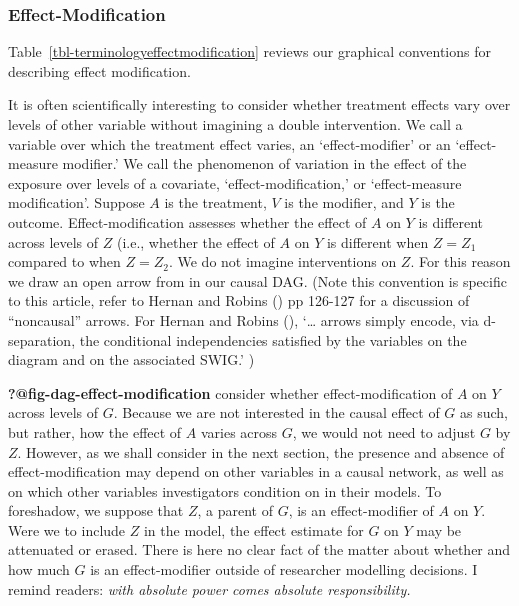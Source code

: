 \documentclass[
  single column]{article}
\begin{document}
\subsubsection{Effect-Modification}\label{effect-modification}

Table~\ref{tbl-terminologyeffectmodification} reviews our graphical
conventions for describing effect modification.

\begin{table}

\caption{\label{tbl-terminologyeffectmodification}}

\centering{

\captionsetup{labelsep=none}

\terminologyeffectmodification

}

\end{table}%

It is often scientifically interesting to consider whether treatment
effects vary over levels of other variable without imagining a double
intervention. We call a variable over which the treatment effect varies,
an `effect-modifier' or an `effect-measure modifier.' We call the
phenomenon of variation in the effect of the exposure over levels of a
covariate, `effect-modification,' or `effect-measure modification'.
Suppose \(A\) is the treatment, \(V\) is the modifier, and \(Y\) is the
outcome. Effect-modification assesses whether the effect of \(A\) on
\(Y\) is different across levels of \(Z\) (i.e., whether the effect of
\(A\) on \(Y\) is different when \(Z = Z_1\) compared to when
\(Z = Z_2\). We do not imagine interventions on \(Z\). For this reason
we draw an open arrow from in our causal DAG. (Note this convention is
specific to this article, refer to Hernan and Robins
() pp 126-127 for a discussion of
``noncausal'' arrows. For Hernan and Robins
(), `\ldots{} arrows simply encode,
via d-separation, the conditional independencies satisfied by the
variables on the diagram and on the associated SWIG.' )

\textbf{?@fig-dag-effect-modification} consider whether
effect-modification of \(A\) on \(Y\) across levels of \(G\). Because we
are not interested in the causal effect of \(G\) as such, but rather,
how the effect of \(A\) varies across \(G\), we would not need to adjust
\(G\) by \(Z\). However, as we shall consider in the next section, the
presence and absence of effect-modification may depend on other
variables in a causal network, as well as on which other variables
investigators condition on in their models. To foreshadow, we suppose
that \(Z\), a parent of \(G\), is an effect-modifier of \(A\) on \(Y\).
Were we to include \(Z\) in the model, the effect estimate for \(G\) on
\(Y\) may be attenuated or erased. There is here no clear fact of the
matter about whether and how much \(G\) is an effect-modifier outside of
researcher modelling decisions. I remind readers: \emph{with absolute
power comes absolute responsibility.}
\end{document}
